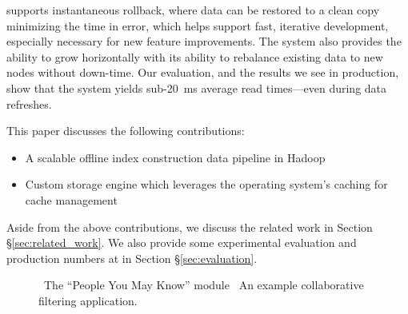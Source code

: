 \projectname{} supports instantaneous rollback, where data can be
restored to a clean copy minimizing the time in error, which helps
support fast, iterative development, especially necessary for new
feature improvements. The system also provides the ability to grow
horizontally with its ability to rebalance existing data to new nodes
without down-time. Our evaluation, and the results we see in production, 
show that the system yields sub-20~ms average read times---even during data
refreshes. 

This paper discusses the following contributions:

\begin{itemize}
	\item A scalable offline index construction data pipeline in Hadoop
        \item Custom storage engine which leverages the operating system's 
caching for cache management
\end{itemize}

Aside from the above contributions, we discuss the related work in Section 
\S\ref{sec:related_work}. We also provide some experimental evaluation and
production numbers at \linkedin{} in Section \S\ref{sec:evaluation}.

\begin{figure}
\centering
{}


\caption{~The ``People You May Know'' module
~An example collaborative filtering
application.}
\end{figure}

